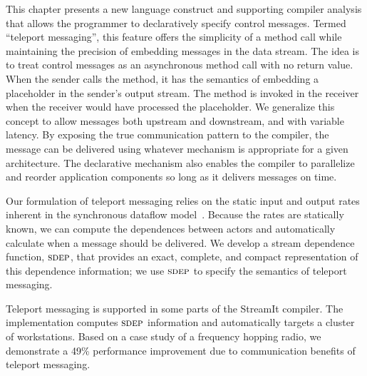 This chapter presents a new language construct and supporting compiler
analysis that allows the programmer to declaratively specify control
messages.  Termed ``teleport messaging'', this feature offers the
simplicity of a method call while maintaining the precision of
embedding messages in the data stream.  The idea is to treat control
messages as an asynchronous method call with no return value.  When
the sender calls the method, it has the semantics of embedding a
placeholder in the sender's output stream.  The method is invoked in
the receiver when the receiver would have processed the placeholder.
We generalize this concept to allow messages both upstream and
downstream, and with variable latency.  By exposing the true
communication pattern to the compiler, the message can be delivered
using whatever mechanism is appropriate for a given architecture.  The
declarative mechanism also enables the compiler to parallelize and
reorder application components so long as it delivers messages on
time.

Our formulation of teleport messaging relies on the static input and
output rates inherent in the synchronous dataflow
model~\cite{lee_static_1987}.  Because the rates are statically known, we can
compute the dependences between actors and automatically calculate
when a message should be delivered.  We develop a stream dependence
function, $\textsc{sdep}$, that provides an exact, complete, and compact
representation of this dependence information; we use $\textsc{sdep}$ to
specify the semantics of teleport messaging.

Teleport messaging is supported in some parts of the StreamIt
compiler.  The implementation computes $\textsc{sdep}$ information and
automatically targets a cluster of workstations.  Based on a case
study of a frequency hopping radio, we demonstrate a 49\% performance
improvement due to communication benefits of teleport messaging.



